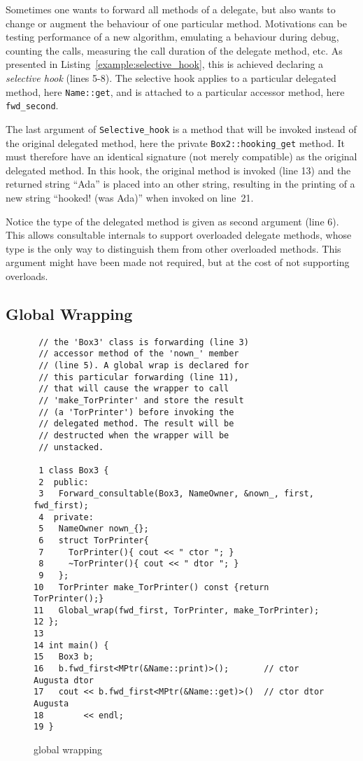 \documentclass{article}
\begin{document}
Sometimes one wants to forward all methods of a delegate, but also wants to change or augment the behaviour of one particular method. Motivations can be testing performance of a new algorithm, emulating a behaviour during debug, counting the calls, measuring the call duration of the delegate method, etc. As presented in Listing~\ref{example:selective_hook}, this is achieved declaring a \textit{selective hook} (lines 5-8). The selective hook applies to a particular delegated method, here \texttt{Name::get}, and is attached to a particular accessor method, here \texttt{fwd\_second}.

The last argument of \texttt{Selective\_hook} is a method that will be invoked instead of the original delegated method, here the private \texttt{Box2::hooking\_get} method. It must therefore have an identical signature (not merely compatible) as the original delegated method. In this hook, the original method is invoked (line 13) and the returned string ``Ada'' is placed into an other string, resulting in the printing of a new string ``hooked! (was Ada)'' when invoked on line~21.
   
Notice the type of the delegated method is given as second argument (line 6). This allows consultable internals to support overloaded delegate methods, whose type is the only way to distinguish them from other overloaded methods. This argument might have been made not required, but at the cost of not supporting overloads.    


\subsection{Global Wrapping}
\begin{figure}[ht]
{\small
\begin{lstlisting}
 // the 'Box3' class is forwarding (line 3) 
 // accessor method of the 'nown_' member 
 // (line 5). A global wrap is declared for 
 // this particular forwarding (line 11), 
 // that will cause the wrapper to call 
 // 'make_TorPrinter' and store the result 
 // (a 'TorPrinter') before invoking the 
 // delegated method. The result will be 
 // destructed when the wrapper will be 
 // unstacked. 

 1 class Box3 {
 2  public:
 3   Forward_consultable(Box3, NameOwner, &nown_, first, fwd_first);
 4  private:
 5   NameOwner nown_{};
 6   struct TorPrinter{
 7     TorPrinter(){ cout << " ctor "; }
 8     ~TorPrinter(){ cout << " dtor "; }
 9   };
10   TorPrinter make_TorPrinter() const {return TorPrinter();}
11   Global_wrap(fwd_first, TorPrinter, make_TorPrinter);
12 };
13 
14 int main() {
15   Box3 b;
16   b.fwd_first<MPtr(&Name::print)>();       // ctor Augusta dtor
17   cout << b.fwd_first<MPtr(&Name::get)>()  // ctor dtor Augusta
18        << endl; 
19 }
\end{lstlisting}}
\cprotect\caption{global wrapping}
\label{example:global_wrapper}
\end{figure}
\end{document}
